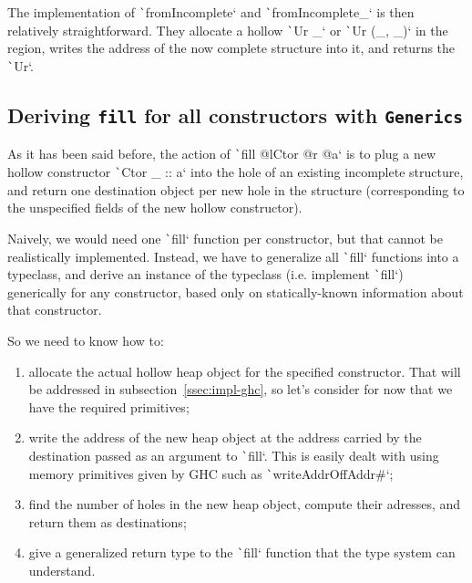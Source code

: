 \documentclass[english]{jflart}
\begin{document}
The implementation of \texttt`fromIncomplete` and \texttt`fromIncomplete_` is then relatively straightforward. They allocate a hollow \texttt`Ur _` or \texttt`Ur (_, _)` in the region, writes the address of the now complete structure into it, and returns the \texttt`Ur`.

\subsection{Deriving \texttt{fill} for all constructors with \texttt{Generics}}\label{ssec:impl-generics}

As it has been said before, the action of \texttt`fill @lCtor @r @a` is to plug a new hollow constructor \texttt`Ctor _ :: a` into the hole of an existing incomplete structure, and return one destination object per new hole in the structure (corresponding to the unspecified fields of the new hollow constructor).

Naively, we would need one \texttt`fill` function per constructor, but that cannot be realistically implemented. Instead, we have to generalize all \texttt`fill` functions into a typeclass, and derive an instance of the typeclass (i.e. implement \texttt`fill`) generically for any constructor, based only on statically-known information about that constructor.

So we need to know how to:
\begin{enumerate}
  \item allocate the actual hollow heap object for the specified constructor. That will be addressed in subsection~\ref{ssec:impl-ghc}, so let's consider for now that we have the required primitives;
  \item write the address of the new heap object at the address carried by the destination passed as an argument to \texttt`fill`. This is easily dealt with using memory primitives given by GHC such as \texttt`writeAddrOffAddr#`;
  \item find the number of holes in the new heap object, compute their adresses, and return them as destinations;
  \item give a generalized return type to the \texttt`fill` function that the type system can understand.
\end{enumerate}
\end{document}
